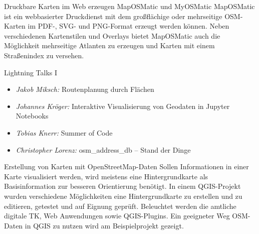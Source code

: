 %
{Druckbare Karten im Web erzeugen}%
{MapOSMatic und MyOSMatic}%
{%
  MapOSMatic ist ein webbasierter Druckdienst mit dem großflächige oder mehrseitige OSM-Karten im
  PDF-, SVG- und PNG-Format erzeugt werden können. Neben verschiedenen Kartenstilen und Overlays
  bietet MapOSMatic auch die Möglichkeit mehrseitige Atlanten zu erzeugen und Karten mit einem
  Straßenindex zu versehen.
}

\abstractNeun{}%
{Lightning Talks I}%
{}%
{%
  \vspace{-2em}
  \begin{itemize}
    \RaggedRight
    \setlength{\itemsep}{-0.25\baselineskip} %
    \item \emph{Jakob Miksch:} Routenplanung durch Flächen
    \item \emph{Johannes Kröger:} Interaktive Visualisierung von Geodaten in Jupyter Notebooks
    \item \emph{Tobias Knerr:} Summer of Code
    \item \emph{Christopher Lorenz:} osm\_address\_db -- Stand der Dinge
  \end{itemize}
  \justifying
}
\vspace{-1.5em}

%
{Erstellung von Karten mit OpenStreetMap-Daten}%
{}%
{Sollen Informationen in einer Karte visualisiert werden, wird meistens eine
Hintergrundkarte als Basisinformation zur besseren Orientierung benötigt. In
einem QGIS-Projekt wurden verschiedene Möglichkeiten eine Hintergrundkarte zu
erstellen und zu editieren, getestet und auf Eignung geprüft. Beleuchtet werden
die amtliche digitale TK, Web Anwendungen sowie QGIS-Plugins. Ein geeigneter
Weg OSM-Daten in QGIS zu nutzen wird am Beispielprojekt gezeigt.}
\vspace{-0.5em}

